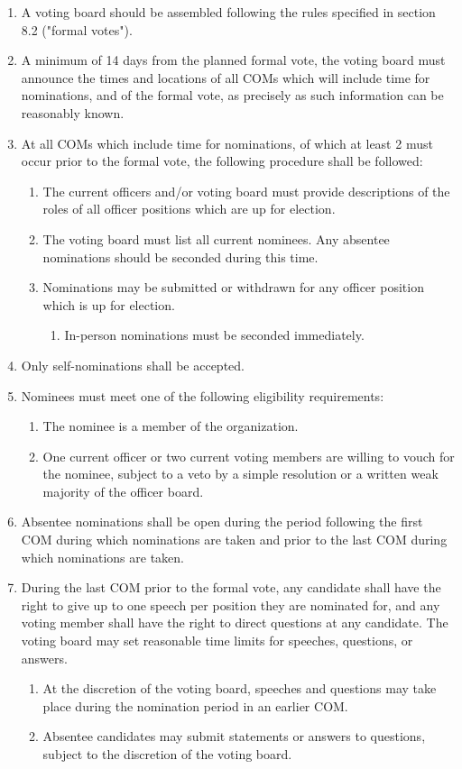 \documentclass[11pt]{article}
\newcounter{h1}
\newcounter{h2}[h1]
\newcounter{h3}[h2]
\begin{document}
\begin{enumerate}
  \item A voting board should be assembled following the rules specified in section 8.2 ("formal votes").  
  \item A minimum of 14 days from the planned formal vote, the voting board must announce the times and locations of all COMs which will include time for nominations, and of the formal vote, as precisely as such information can be reasonably known.  
  \item At all COMs which include time for nominations, of which at least 2 must occur prior to the formal vote, the following procedure shall be followed:  
  \begin{enumerate}
    \item The current officers and/or voting board must provide descriptions of the roles of all officer positions which are up for election.  
    \item The voting board must list all current nominees. Any absentee nominations should be seconded during this time.  
    \item Nominations may be submitted or withdrawn for any officer position which is up for election.  
    \begin{enumerate}
      \item In-person nominations must be seconded immediately.  
    \end{enumerate}
  \end{enumerate}
  \item Only self-nominations shall be accepted.  
  \item Nominees must meet one of the following eligibility requirements:  
  \begin{enumerate}
    \item The nominee is a member of the organization.  
    \item One current officer or two current voting members are willing to vouch for the nominee, subject to a veto by a simple resolution or a written weak majority of the officer board.  
  \end{enumerate}
  \item Absentee nominations shall be open during the period following the first COM during which nominations are taken and prior to the last COM during which nominations are taken.  
  \item During the last COM prior to the formal vote, any candidate shall have the right to give up to one speech per position they are nominated for, and any voting member shall have the right to direct questions at any candidate. The voting board may set reasonable time limits for speeches, questions, or answers.  
  \begin{enumerate}
    \item At the discretion of the voting board, speeches and questions may take place during the nomination period in an earlier COM.  
    \item Absentee candidates may submit statements or answers to questions, subject to the discretion of the voting board.
  \end{enumerate}
\end{enumerate}
\end{document}
